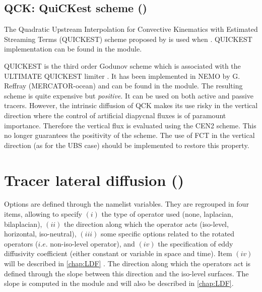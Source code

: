 \documentclass[../tex_main/NEMO_manual]{subfiles}
\begin{document}
\subsection{QCK: QuiCKest scheme (\protect{})}
\label{subsec:TRA_adv_qck}

The Quadratic Upstream Interpolation for Convective Kinematics with 
Estimated Streaming Terms (QUICKEST) scheme proposed by \citet{Leonard1979} 
is used when . 
QUICKEST implementation can be found in the  module.

QUICKEST is the third order Godunov scheme which is associated with the ULTIMATE QUICKEST 
limiter \citep{Leonard1991}. It has been implemented in NEMO by G. Reffray 
(MERCATOR-ocean) and can be found in the  module.
The resulting scheme is quite expensive but \emph{positive}. 
It can be used on both active and passive tracers. 
However, the intrinsic diffusion of QCK makes its use risky in the vertical 
direction where the control of artificial diapycnal fluxes is of paramount importance. 
Therefore the vertical flux is evaluated using the CEN2 scheme. 
This no longer guarantees the positivity of the scheme. 
The use of FCT in the vertical direction (as for the UBS case) should be implemented 
to restore this property.



\section{Tracer lateral diffusion (\protect{})}
\label{sec:TRA_ldf}
 
Options are defined through the  namelist variables.
They are regrouped in four items, allowing to specify 
$(i)$   the type of operator used (none, laplacian, bilaplacian), 
$(ii)$  the direction along which the operator acts (iso-level, horizontal, iso-neutral), 
$(iii)$ some specific options related to the rotated operators ($i.e.$ non-iso-level operator), and 
$(iv)$  the specification of eddy diffusivity coefficient (either constant or variable in space and time).
Item $(iv)$ will be described in \autoref{chap:LDF} .
The direction along which the operators act is defined through the slope between this direction and the iso-level surfaces.
The slope is computed in the  module and will also be described in \autoref{chap:LDF}. 
\end{document}
